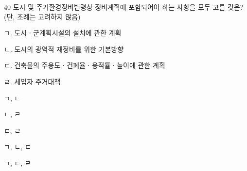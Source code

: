 \begin{question}{40}
도시 및 주거환경정비법령상 정비계획에 포함되어야 하는 사항을 모두 고른 것은? (단, 조례는 고려하지 않음)
\begin{framedtext}
ㄱ. 도시ㆍ군계획시설의 설치에 관한 계획 \par
ㄴ. 도시의 광역적 재정비를 위한 기본방향 \par
ㄷ. 건축물의 주용도ㆍ건폐율ㆍ용적률ㆍ높이에 관한 계획 \par
ㄹ. 세입자 주거대책
\end{framedtext}
\begin{choices}
  \item ㄱ, ㄴ
  \item ㄴ, ㄹ
  \item ㄷ, ㄹ
  \item ㄱ, ㄴ, ㄷ
  \item ㄱ, ㄷ, ㄹ
\end{choices}
\end{question}
